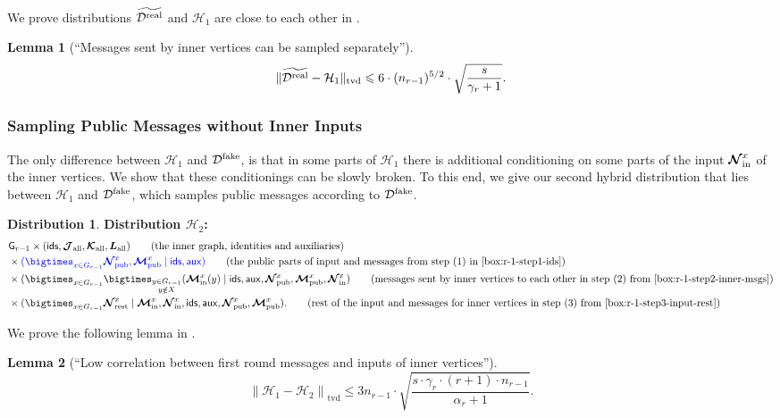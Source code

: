 \documentclass[11pt]{article}
\newtheorem{lemma}{Lemma}[section]
\theoremstyle{definition}
\newtheorem{mddistribution}{Distribution}
\newenvironment{Distribution}{\begin{tbox}\begin{mddistribution}}{\end{mddistribution}\end{tbox}}
\renewcommand{\leq}{\leqslant}
\newcommand{\tvd}[2]{\ensuremath{\norm{#1 - #2}_{\mathrm{tvd}}}}
\newcommand{\norm}[1]{\ensuremath{\|#1\|}}
\newenvironment{tbox}{\begin{tcolorbox}[
		enlarge top by=5pt,
		enlarge bottom by=5pt,
		 breakable,
		 boxsep=0pt,
                  left=4pt,
                  right=4pt,
                  top=10pt,
                  arc=4pt,
                  boxrule=1pt,toprule=1pt,
                  colback=white
                  ]%
	}
{\end{tcolorbox}}
\newcommand{\rv}[1]{\ensuremath{{\mathsf{#1}}}\xspace}
\newcounter{mybox}
\renewcommand{\themybox}{\arabic{mybox}}
\newcommand{\namethebox}{\begin{center}\textbf{Box~\themybox} \end{center}}
\newcommand{\rNinner}[2]{\ensuremath{\bm{\mathcal{N}}_{\textnormal{in}}^{#1_{#2}}}}
\newcommand{\cH}{\ensuremath{\mathcal{H}}}
\newcommand{\cD}{\ensuremath{\mathcal{D}}}
\newcommand{\cDreal}{\ensuremath{\cD^{\textnormal{real}}}}
\newcommand{\cDrealtil}{\ensuremath{\widetilde{\cDreal}}}
\newcommand{\cDfake}{\ensuremath{\cD^{\textnormal{fake}}}}
\newcommand{\raux}{\ensuremath{\rv{aux}}}
\newcommand{\rcJall}{\ensuremath{\bm{\mathcal{J}}_{\textnormal{all}}}}
\newcommand{\rcKall}{\ensuremath{\bm{\mathcal{K}}_{\textnormal{all}}}}
\newcommand{\rLall}{\ensuremath{\bm{L}_{\textnormal{all}}}}
\newcommand{\rNpub}[1]{\ensuremath{\bm{\mathcal{N}}_{\textnormal{pub}}^{#1}}}
\newcommand{\rMpub}[1]{\ensuremath{\bm{\mathcal{M}}_{\textnormal{pub}}^{#1}}}
\newcommand{\rMinner}[1]{\ensuremath{\bm{\mathcal{M}}_{\textnormal{in}}^{#1}}}
\newcommand{\rNrest}[1]{\ensuremath{\bm{\mathcal{N}}^{#1}_{\textnormal{rest}}}}
\newcommand{\rG}{\ensuremath{\rv{G}}}
\newcommand{\rids}{\ensuremath{\rv{ids}}}
\begin{document}
We prove distributions $\cDrealtil$ and $\cH_1$ are close to each other in .

\begin{lemma}[``Messages sent by inner vertices can be sampled separately'']\label{lem:hybrid-1-inner-msgs}
	\[
	\tvd{\cDrealtil}{\cH_1} \leq 6 \cdot (n_{r-1})^{5/2} \cdot \sqrt{\frac{s}{\gamma_r + 1}}.
	\]
\end{lemma}

\subsubsection*{Sampling Public Messages without Inner Inputs}


The only difference between $\cH_1$ and $\cDfake$, is that in some parts of $\cH_1$ there is additional conditioning on some parts of the input $\rNinner{x}{}$ of the inner vertices. We show that these conditionings can be slowly broken. To this end, we give our second hybrid distribution that lies between $\cH_1$ and $\cDfake$, which samples public messages according to $\cDfake$.

\begin{Distribution}\label{box:hybrid2-public-msgs}
	\textbf{Distribution $\cH_2$:}
\begin{align*}
	&\rG_{r-1} \times (\rids, \rcJall, \rcKall, \rLall) \tag{the inner graph, identities and auxiliaries}\\
	&\times \eqcolor{(\bigtimes_{x \in G_{r-1}} \rNpub{x}, \rMpub{x} \mid \rids, \raux)} \tag{the public parts of input and messages from step (1) in \Cref{box:r-1-step1-ids}} \\
	&\times (\bigtimes_{x \in G_{r-1}}\bigtimes_{\substack{y \in G_{r-1} \\y \notin X}} (\rMinner{x}(y) \mid  \rids, \raux, \rNpub{x}, \rMpub{x}, \rNinner{x}{})   \tag{messages sent by inner vertices to each other in step (2) from \Cref{box:r-1-step2-inner-msgs}} \\
	&\times (\bigtimes_{x \in G_{r-1}}  \rNrest{x} \mid \rMinner{x}, \rNinner{x}{}, \rids, \raux, \rNpub{x}, \rMpub{x}). \tag{rest of the input and messages for inner vertices in step (3) from \Cref{box:r-1-step3-input-rest}}
\end{align*}
\end{Distribution}

We prove the following lemma in .
\begin{lemma}[``Low correlation between first round messages and inputs of inner vertices'']\label{lem:cH1-cH2-public-msgs}
	\[
		\tvd{\cH_1}{\cH_2} \leq 3n_{r-1}  \cdot \sqrt{\frac{s \cdot \gamma_r  \cdot (r+1) \cdot n_{r-1}}{\alpha_r + 1}}.
	\]
\end{lemma}
\end{document}
